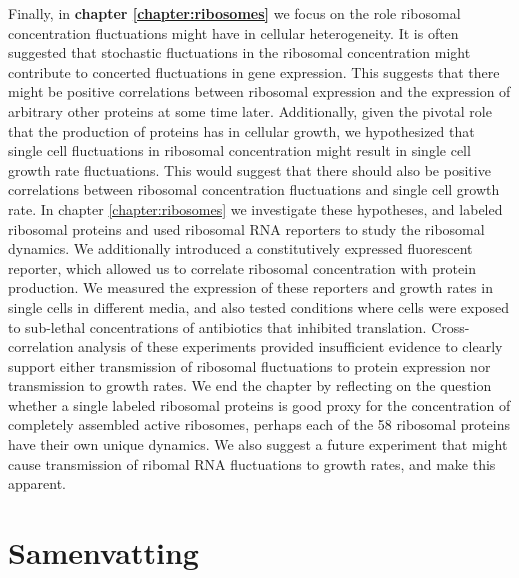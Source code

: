 Finally, in \textbf{chapter \ref{chapter:ribosomes}} we focus on the role ribosomal concentration fluctuations might have in cellular heterogeneity.
%
%
It is often suggested that stochastic fluctuations in the ribosomal concentration might 
contribute to concerted fluctuations in gene expression. 
This suggests that there might be 
positive correlations between ribosomal expression and the expression of arbitrary other proteins at some time later.
%
Additionally, given the pivotal role that the production of proteins has in cellular growth, 
we hypothesized that single cell fluctuations in ribosomal concentration 
might result in single cell growth rate fluctuations.
This would suggest that there should also be positive correlations between ribosomal concentration fluctuations and single cell growth rate.
%
In chapter \ref{chapter:ribosomes} we investigate these hypotheses,
and labeled ribosomal proteins and used ribosomal RNA reporters to study the ribosomal dynamics.
%
We additionally introduced 
a constitutively expressed fluorescent reporter, which allowed us to 
correlate ribosomal concentration with protein production.
%
We measured the expression of these reporters and growth rates in single cells in different media, 
and also tested conditions where cells were exposed to sub-lethal concentrations of antibiotics that inhibited translation.
%
Cross-correlation analysis of these experiments 
provided insufficient evidence to clearly support either 
transmission of ribosomal fluctuations to
protein expression
nor transmission to growth rates.
%
We end the chapter by reflecting on the question whether a single labeled ribosomal proteins is good proxy for the concentration of 
completely assembled active ribosomes,
perhaps each of the 58 ribosomal proteins have their own unique dynamics. 
%
We also suggest a future experiment that might cause transmission of ribomal RNA fluctuations to growth rates, and make this apparent.






\chapter*{Samenvatting}


